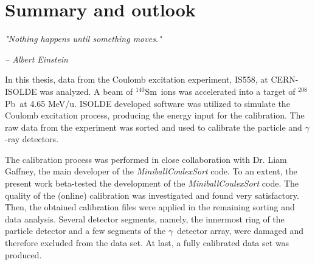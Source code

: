 \documentclass[twoside,english]{uiofysmaster/uiofysmaster}
\newcommand{\Sm}{$^{140}$Sm} %
\newcommand{\Pb}{$^{208}$Pb}
\newcommand{\ga}{$\gamma$}
\let\orgautoref\autoref
\renewcommand{\autoref}
        {%
		 \def\sectionautorefname{Section}%
		 \def\subsectionautorefname{Section}%
		 \def\subsubsectionautorefname{Section}%
		 \def\chapterautorefname{Chapter}%
          \orgautoref}
\begin{document}
\bigskip







\chapter{Summary and outlook}\label{ch:SO}
\epigraph{\textit{"Nothing happens until something moves."}}{\textit{– Albert Einstein}}


In this thesis, data from the Coulomb excitation experiment, IS558, at CERN-ISOLDE was analyzed. 
A beam of \Sm\ ions was accelerated into a target of \Pb\ at 4.65 MeV/u. 
ISOLDE developed software was utilized to simulate the Coulomb excitation process, producing the energy input for the calibration.
The raw data from the experiment was sorted and used to calibrate the particle and \ga-ray detectors.

The calibration process was performed in close collaboration with Dr. Liam Gaffney, the main developer of the \textsl{MiniballCoulexSort} code.
To an extent, the present work beta-tested the development of the \textsl{MiniballCoulexSort} code.
The quality of the (online) calibration was investigated and found very satisfactory. 
Then, the obtained calibration files were applied in the remaining sorting and data analysis.
Several detector segments, namely, the innermost ring of the particle detector and a few segments of the \ga\ detector array, were damaged and therefore excluded from the data set.
At last, a fully calibrated data set was produced. 
\end{document}
